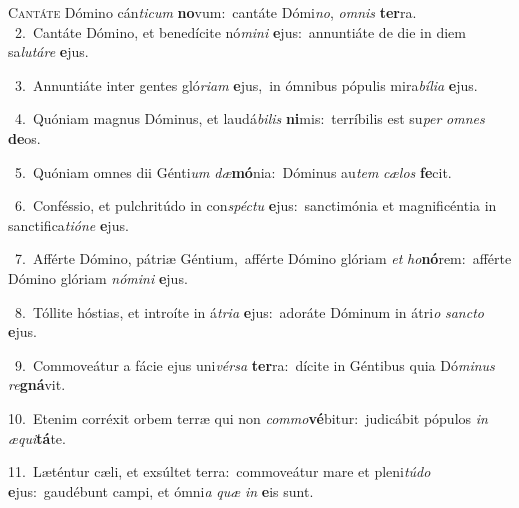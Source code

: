 \lettrine{\initial\textcolor{\initialcolor}{C}}{antáte} Dómino cán\-\textit{ti}\-\textit{cum} \textbf{no}\-vum:~\star cantáte Dómi\-\textit{no}\-, \textit{om}\-\textit{nis} \textbf{ter}\-ra.\\
{\numbfont\textcolor{\numbcolor}{~2.}}~Cantáte Dómino, et benedícite nó\-\textit{mi}\-\textit{ni} \textbf{e}\-jus:~\star annuntiáte de die in diem sa\-\textit{lu}\-\textit{tá}\textit{re} \textbf{e}\-jus.\par
{\numbfont\textcolor{\numbcolor}{~3.}}~Annuntiáte inter gentes gló\-\textit{ri}\-\textit{am} \textbf{e}\-jus,~\star in ómnibus pópulis mira\-\textit{bí}\-\textit{li}\textit{a} \textbf{e}\-jus.\par
{\numbfont\textcolor{\numbcolor}{~4.}}~Quóniam magnus Dóminus, et laudá\-\textit{bi}\-\textit{lis} \textbf{ni}\-mis:~\star terríbilis est su\textit{per} \textit{om}\-\textit{nes} \textbf{de}\-os.\par
{\numbfont\textcolor{\numbcolor}{~5.}}~Quóniam omnes dii Génti\textit{um} \textit{dæ}\-\textbf{mó}nia:~\star Dóminus au\textit{tem} \textit{cæ}\-\textit{los} \textbf{fe}\-cit.\par
{\numbfont\textcolor{\numbcolor}{~6.}}~Conféssio, et pulchritúdo in con\-\textit{spéc}\-\textit{tu} \textbf{e}\-jus:~\star sanctimónia et magnificéntia in sanctifica\-\textit{ti}\-\textit{ó}\textit{ne} \textbf{e}\-jus.\par
{\numbfont\textcolor{\numbcolor}{~7.}}~Afférte Dómino, pátriæ Géntium,~\dagger afférte Dómino glóriam \textit{et} \textit{ho}\-\textbf{nó}rem:~\star afférte Dómino glóriam \textit{nó}\-\textit{mi}\textit{ni} \textbf{e}\-jus.\par
{\numbfont\textcolor{\numbcolor}{~8.}}~Tóllite hóstias, et introíte in á\-\textit{tri}\-\textit{a} \textbf{e}\-jus:~\star adoráte Dóminum in átri\textit{o} \textit{sanc}\-\textit{to} \textbf{e}\-jus.\par
{\numbfont\textcolor{\numbcolor}{~9.}}~Commoveátur a fácie ejus uni\-\textit{vér}\-\textit{sa} \textbf{ter}\-ra:~\star dícite in Géntibus quia Dó\-\textit{mi}\-\textit{nus} \textit{re}\-\textbf{gná}vit.\par
{\numbfont\textcolor{\numbcolor}{10.}}~Etenim corréxit orbem terræ qui non \textit{com}\-\textit{mo}\textbf{vé}bitur:~\star judicábit pópulos \textit{in} \textit{æ}\-\textit{qui}\textbf{tá}te.\par
{\numbfont\textcolor{\numbcolor}{11.}}~Læténtur cæli, et exsúltet terra:~\dagger commoveátur mare et pleni\-\textit{tú}\-\textit{do} \textbf{e}\-jus:~\star gaudébunt campi, et ómni\textit{a} \textit{quæ} \textit{in} \textbf{e}\-is sunt.\par
